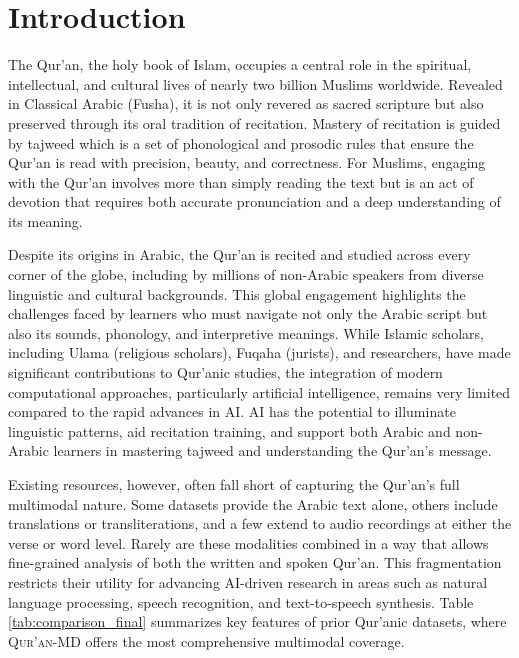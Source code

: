 \section{Introduction}
\label{sec:intro}

The Qur’an, the holy book of Islam, occupies a central role in the spiritual, intellectual, and cultural lives of nearly two billion Muslims worldwide. Revealed in Classical Arabic (Fusha), it is not only revered as sacred scripture but also preserved through its oral tradition of recitation. Mastery of recitation is guided by tajweed which is a set of phonological and prosodic rules that ensure the Qur’an is read with precision, beauty, and correctness. For Muslims, engaging with the Qur’an involves more than simply reading the text but is an act of devotion that requires both accurate pronunciation and a deep understanding of its meaning.

Despite its origins in Arabic, the Qur’an is recited and studied across every corner of the globe, including by millions of non-Arabic speakers from diverse linguistic and cultural backgrounds. This global engagement highlights the challenges faced by learners who must navigate not only the Arabic script but also its sounds, phonology, and interpretive meanings. While Islamic scholars, including Ulama (religious scholars), Fuqaha (jurists), and researchers, have made significant contributions to Qur’anic studies, the integration of modern computational approaches, particularly artificial intelligence, remains very limited compared to the rapid advances in AI. AI has the potential to illuminate linguistic patterns, aid recitation training, and support both Arabic and non-Arabic learners in mastering tajweed and understanding the Qur’an’s message.

Existing resources, however, often fall short of capturing the Qur’an’s full multimodal nature. Some datasets provide the Arabic text alone, others include translations or transliterations, and a few extend to audio recordings at either the verse or word level. Rarely are these modalities combined in a way that allows fine-grained analysis of both the written and spoken Qur’an. This fragmentation restricts their utility for advancing AI-driven research in areas such as natural language processing, speech recognition, and text-to-speech synthesis. Table \ref{tab:comparison_final} summarizes key features of prior Qur’anic datasets, where \textsc{Qur’an-MD} offers the most comprehensive multimodal coverage.


